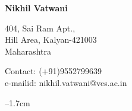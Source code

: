 \documentclass[letterpaper,11pt,oneside]{article}
\begin{document}
	
	\begin{center}
		\noindent  \LARGE{\textbf{Nikhil Vatwani}}  \\
	\end{center}
	\vspace{-2ex}
	\noindent\hrulefill 
	\normalsize
	
	\begin{multicols}{2}
		\begin{flushleft}
			404, Sai Ram Apt.,
			\\ Hill Area, Kalyan-421003
			\\ Maharashtra
		\end{flushleft}
		\begin{flushleft}
			Contact: (+91)9552799639
			\\e-mailid: nikhil.vatwani@ves.ac.in
		\end{flushleft}
	\end{multicols}
	
	\begin{flushright}
		\advance\rightskip--1.7cm
	\end{flushright}
	
	\vspace{1em}
	
	
\end{document}

